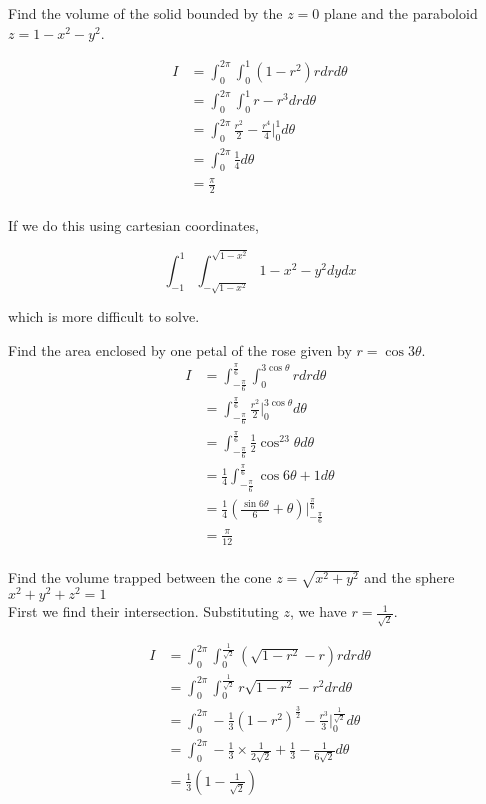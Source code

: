 \documentclass[12pt]{article}
\begin{document}
\begin{ex}
Find the volume of the solid bounded by the $z = 0$ plane and the paraboloid $z = 1 - x^2 - y^2$.

\begin{align*}
I &= \int_0^{2\pi} \int_0^1 (1 - r^2) r dr d\theta \\
&= \int_0^{2\pi} \int_0^1 r - r^3 dr d\theta \\
&= \int_0^{2\pi} \frac{r^2}{2} - \frac{r^4}{4} \Big |_0^1 d\theta \\
&= \int_0^{2\pi} \frac{1}{4} d\theta \\
&= \frac{\pi}{2} \\
\end{align*}

If we do this using cartesian coordinates,

$$\int_{-1}^1 \int_{-\sqrt{1-x^2}}^{\sqrt{1-x^2}} 1 - x^2 - y^2 dydx$$

which is more difficult to solve.
\end{ex}

\begin{ex}
Find the area enclosed by one petal of the rose given by $r = \cos 3\theta$. \\

\begin{align*}
I &= \int_{-\frac{\pi}{6}}^{\frac{\pi}{6}} \int_0^{3\cos\theta} rdrd\theta \\
&= \int_{-\frac{\pi}{6}}^{\frac{\pi}{6}} \frac{r^2}{2} \Big |_0^{3\cos\theta} d\theta \\
&= \int_{-\frac{\pi}{6}}^{\frac{\pi}{6}} \frac{1}{2} \cos^23\theta d\theta \\
&= \frac{1}{4} \int_{-\frac{\pi}{6}}^{\frac{\pi}{6}} \cos6\theta + 1 d\theta \\
&= \frac{1}{4} \left(\frac{\sin6\theta}{6} + \theta \right) \Big |_{-\frac{\pi}{6}}^{\frac{\pi}{6}} \\
&= \frac{\pi}{12} \\
\end{align*}
\end{ex}

\begin{ex}
Find the volume trapped between the cone $z = \sqrt{x^2 + y^2}$ and the sphere $x^2 + y^2 + z^2 = 1$ \\
First we find their intersection. Substituting $z$, we have $r = \frac{1}{\sqrt{2}}$.

\begin{align*}
I &= \int_0^{2\pi} \int_0^{\frac{1}{\sqrt{2}}} (\sqrt{1 - r^2} - r)rdrd\theta \\
&= \int_0^{2\pi} \int_0^{\frac{1}{\sqrt{2}}} r\sqrt{1-r^2} - r^2 dr d\theta \\
&= \int_0^{2\pi} -\frac{1}{3} (1-r^2)^{\frac{3}{2}} - \frac{r^3}{3} \Big |_0^{\frac{1}{\sqrt{2}}} d\theta \\
&= \int_0^{2\pi} -\frac{1}{3} \times \frac{1}{2\sqrt{2}} + \frac{1}{3} - \frac{1}{6\sqrt{2}} d\theta \\
&= \frac{1}{3} \left(1 - \frac{1}{\sqrt{2}}\right) \\
\end{align*}
\end{ex}
\end{document}

